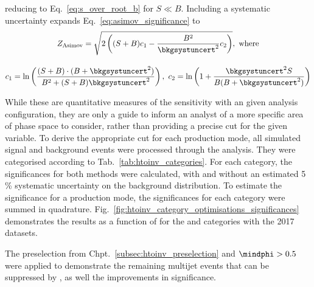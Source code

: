 reducing to Eq.~\ref{eq:s_over_root_b} for $S \ll B$. Including a systematic uncertainty expands Eq.~\ref{eq:asimov_significance} to
\begin{equation}
    \begin{gathered}  %
Z_{\mathrm{Asimov}} = \sqrt{2 \left( (S + B) c_1 - \frac{B^2}{\bkgsystuncert^2}c_2 \right)}, \ \text{where} \\[1em]
c_1 = \ln\left( \frac{(S + B) \cdot (B + \bkgsystuncert^2)}{B^2 + (S + B)\bkgsystuncert^2} \right), \ c_2 = \ln\left( 1 + \frac{\bkgsystuncert^2 S}{B(B + \bkgsystuncert^2)} \right)
    \end{gathered}
\label{eq:asimov_significance_systs}
\end{equation}

While these are quantitative measures of the sensitivity with an given analysis configuration, they are only a guide to inform an analyst of a more specific area of phase space to consider, rather than providing a precise cut for the given variable. To derive the appropriate cut for each production mode, all simulated signal and background events were processed through the analysis. They were categorised according to Tab.~\ref{tab:htoinv_categories}. For each category, the significances for both methods were calculated, with and without an estimated 5\,\% systematic uncertainty on the background distribution. To estimate the significance for a production mode, the significances for each category were summed in quadrature. Fig.~\ref{fig:htoinv_category_optimisations_significances} demonstrates the results as a function of \omegaTilde for the \ttH and \VH categories with the 2017 datasets.

The preselection from Chpt.~\ref{subsec:htoinv_preselection} and $\mindphi > \text{0.5}$ were applied to demonstrate the remaining multijet events that can be suppressed by \omegaTilde, as well the improvements in significance.

